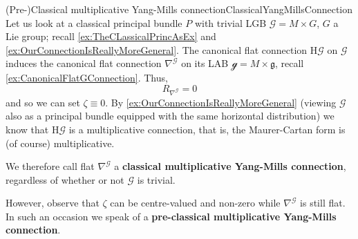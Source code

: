 \documentclass[reqno,a4paper,oneside]{amsart}
\theoremstyle{plain}
\theoremstyle{remark}
\theoremstyle{definition}
\begin{document}
\begin{examples}{(Pre-)Classical multiplicative Yang-Mills connection}{ClassicalYangMillsConnection}
Let us look at a classical principal bundle $P$ with trivial LGB $\mathcal{G} = M \times G$, $G$ a Lie group; recall \ref{ex:TheCLassicalPrincAsEx} and \ref{ex:OurConnectionIsReallyMoreGeneral}. The canonical flat connection $\mathrm{H}\mathcal{G}$ on $\mathcal{G}$ induces the canonical flat connection $\nabla^{\mathcal{G}}$ on its LAB $\mathcal{g} = M \times \mathfrak{g}$, recall \ref{ex:CanonicalFlatGConnection}. Thus,
\begin{equation*}
R_{\nabla^{\mathcal{G}}} = 0
\end{equation*}
and so we can set $\zeta \equiv 0$. By \ref{ex:OurConnectionIsReallyMoreGeneral} (viewing $\mathcal{G}$ also as a principal bundle equipped with the same horizontal distribution) we know that $\mathrm{H}\mathcal{G}$ is a multiplicative connection, that is, the Maurer-Cartan form is (of course) multiplicative.

We therefore call flat $\nabla^{\mathcal{G}}$ a \textbf{classical multiplicative Yang-Mills connection}, regardless of whether or not $\mathcal{G}$ is trivial.

However, observe that $\zeta$ can be centre-valued and non-zero while $\nabla^{\mathcal{G}}$ is still flat. In such an occasion we speak of a \textbf{pre-classical multiplicative Yang-Mills connection}.
\end{examples}
\end{document}
